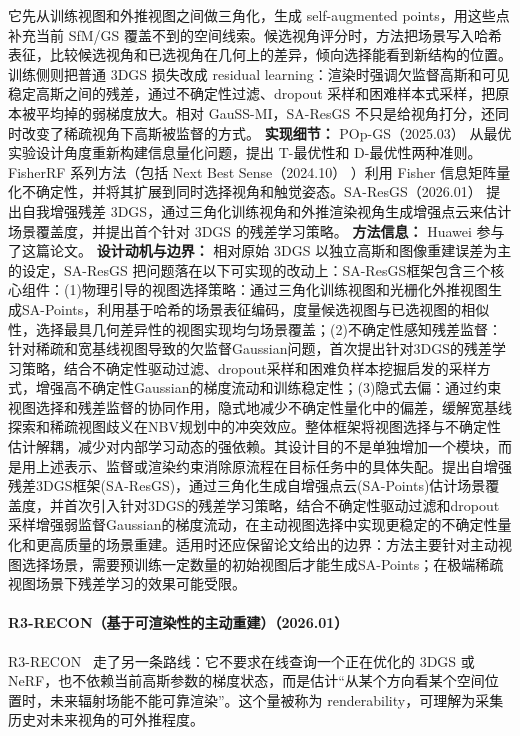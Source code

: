 它先从训练视图和外推视图之间做三角化，生成 self-augmented points，用这些点补充当前 SfM/GS 覆盖不到的空间线索。候选视角评分时，方法把场景写入哈希表征，比较候选视角和已选视角在几何上的差异，倾向选择能看到新结构的位置。训练侧则把普通 3DGS 损失改成 residual learning：渲染时强调欠监督高斯和可见稳定高斯之间的残差，通过不确定性过滤、dropout 采样和困难样本式采样，把原本被平均掉的弱梯度放大。相对 GauSS-MI，SA-ResGS 不只是给视角打分，还同时改变了稀疏视角下高斯被监督的方式。
\textbf{实现细节：} POp-GS（2025.03） 从最优实验设计角度重新构建信息量化问题，提出 T-最优性和 D-最优性两种准则。FisherRF 系列方法（包括 Next Best Sense（2024.10） ）利用 Fisher 信息矩阵量化不确定性，并将其扩展到同时选择视角和触觉姿态。SA-ResGS（2026.01） 提出自我增强残差 3DGS，通过三角化训练视角和外推渲染视角生成增强点云来估计场景覆盖度，并提出首个针对 3DGS 的残差学习策略。
\textbf{方法信息：} Huawei 参与了这篇论文。
\textbf{设计动机与边界：} 相对原始 3DGS 以独立高斯和图像重建误差为主的设定，SA-ResGS 把问题落在以下可实现的改动上：SA-ResGS框架包含三个核心组件：(1)物理引导的视图选择策略：通过三角化训练视图和光栅化外推视图生成SA-Points，利用基于哈希的场景表征编码，度量候选视图与已选视图的相似性，选择最具几何差异性的视图实现均匀场景覆盖；(2)不确定性感知残差监督：针对稀疏和宽基线视图导致的欠监督Gaussian问题，首次提出针对3DGS的残差学习策略，结合不确定性驱动过滤、dropout采样和困难负样本挖掘启发的采样方式，增强高不确定性Gaussian的梯度流动和训练稳定性；(3)隐式去偏：通过约束视图选择和残差监督的协同作用，隐式地减少不确定性量化中的偏差，缓解宽基线探索和稀疏视图歧义在NBV规划中的冲突效应。整体框架将视图选择与不确定性估计解耦，减少对内部学习动态的强依赖。其设计目的不是单独增加一个模块，而是用上述表示、监督或渲染约束消除原流程在目标任务中的具体失配。提出自增强残差3DGS框架(SA-ResGS)，通过三角化生成自增强点云(SA-Points)估计场景覆盖度，并首次引入针对3DGS的残差学习策略，结合不确定性驱动过滤和dropout采样增强弱监督Gaussian的梯度流动，在主动视图选择中实现更稳定的不确定性量化和更高质量的场景重建。适用时还应保留论文给出的边界：方法主要针对主动视图选择场景，需要预训练一定数量的初始视图后才能生成SA-Points；在极端稀疏视图场景下残差学习的效果可能受限。
\paragraph{R3-RECON（基于可渲染性的主动重建）（2026.01）}
R3-RECON~\cite{2601_07484} 走了另一条路线：它不要求在线查询一个正在优化的 3DGS 或 NeRF，也不依赖当前高斯参数的梯度状态，而是估计“从某个方向看某个空间位置时，未来辐射场能不能可靠渲染”。这个量被称为 renderability，可理解为采集历史对未来视角的可外推程度。

